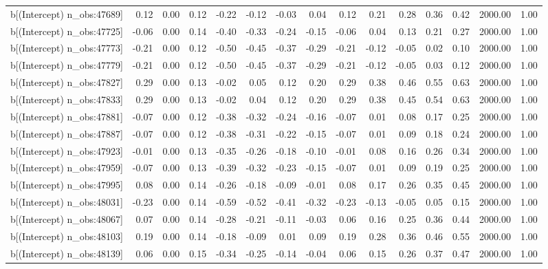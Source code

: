 \begin{table}[ht]
\begin{tabular}{rrrrrrrrrrrrrrr}
  b[(Intercept) n\_obs:47689] & 0.12 & 0.00 & 0.12 & -0.22 & -0.12 & -0.03 & 0.04 & 0.12 & 0.21 & 0.28 & 0.36 & 0.42 & 2000.00 & 1.00 \\ 
  b[(Intercept) n\_obs:47725] & -0.06 & 0.00 & 0.14 & -0.40 & -0.33 & -0.24 & -0.15 & -0.06 & 0.04 & 0.13 & 0.21 & 0.27 & 2000.00 & 1.00 \\ 
  b[(Intercept) n\_obs:47773] & -0.21 & 0.00 & 0.12 & -0.50 & -0.45 & -0.37 & -0.29 & -0.21 & -0.12 & -0.05 & 0.02 & 0.10 & 2000.00 & 1.00 \\ 
  b[(Intercept) n\_obs:47779] & -0.21 & 0.00 & 0.12 & -0.50 & -0.45 & -0.37 & -0.29 & -0.21 & -0.12 & -0.05 & 0.03 & 0.12 & 2000.00 & 1.00 \\ 
  b[(Intercept) n\_obs:47827] & 0.29 & 0.00 & 0.13 & -0.02 & 0.05 & 0.12 & 0.20 & 0.29 & 0.38 & 0.46 & 0.55 & 0.63 & 2000.00 & 1.00 \\ 
  b[(Intercept) n\_obs:47833] & 0.29 & 0.00 & 0.13 & -0.02 & 0.04 & 0.12 & 0.20 & 0.29 & 0.38 & 0.45 & 0.54 & 0.63 & 2000.00 & 1.00 \\ 
  b[(Intercept) n\_obs:47881] & -0.07 & 0.00 & 0.12 & -0.38 & -0.32 & -0.24 & -0.16 & -0.07 & 0.01 & 0.08 & 0.17 & 0.25 & 2000.00 & 1.00 \\ 
  b[(Intercept) n\_obs:47887] & -0.07 & 0.00 & 0.12 & -0.38 & -0.31 & -0.22 & -0.15 & -0.07 & 0.01 & 0.09 & 0.18 & 0.24 & 2000.00 & 1.00 \\ 
  b[(Intercept) n\_obs:47923] & -0.01 & 0.00 & 0.13 & -0.35 & -0.26 & -0.18 & -0.10 & -0.01 & 0.08 & 0.16 & 0.26 & 0.34 & 2000.00 & 1.00 \\ 
  b[(Intercept) n\_obs:47959] & -0.07 & 0.00 & 0.13 & -0.39 & -0.32 & -0.23 & -0.15 & -0.07 & 0.01 & 0.09 & 0.19 & 0.25 & 2000.00 & 1.00 \\ 
  b[(Intercept) n\_obs:47995] & 0.08 & 0.00 & 0.14 & -0.26 & -0.18 & -0.09 & -0.01 & 0.08 & 0.17 & 0.26 & 0.35 & 0.45 & 2000.00 & 1.00 \\ 
  b[(Intercept) n\_obs:48031] & -0.23 & 0.00 & 0.14 & -0.59 & -0.52 & -0.41 & -0.32 & -0.23 & -0.13 & -0.05 & 0.05 & 0.15 & 2000.00 & 1.00 \\ 
  b[(Intercept) n\_obs:48067] & 0.07 & 0.00 & 0.14 & -0.28 & -0.21 & -0.11 & -0.03 & 0.06 & 0.16 & 0.25 & 0.36 & 0.44 & 2000.00 & 1.00 \\ 
  b[(Intercept) n\_obs:48103] & 0.19 & 0.00 & 0.14 & -0.18 & -0.09 & 0.01 & 0.09 & 0.19 & 0.28 & 0.36 & 0.46 & 0.55 & 2000.00 & 1.00 \\ 
  b[(Intercept) n\_obs:48139] & 0.06 & 0.00 & 0.15 & -0.34 & -0.25 & -0.14 & -0.04 & 0.06 & 0.15 & 0.26 & 0.37 & 0.47 & 2000.00 & 1.00 \\ 

\end{tabular}
\end{table}
